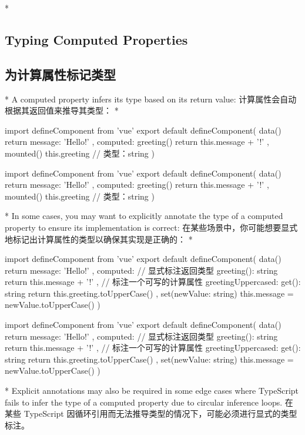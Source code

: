 \begin{paracol}{2} 
 
\switchcolumn[0]*%
\subsection{Typing Computed Properties}
\switchcolumn
\subsection{为计算属性标记类型}
\switchcolumn[0]*%
A computed property infers its type based on its return value:
\switchcolumn
计算属性会自动根据其返回值来推导其类型：
\switchcolumn[0]*%
\begin{codeTs}
import { defineComponent } from 'vue'
export default defineComponent({
  data() {
    return {
      message: 'Hello!'
    }
  },
  computed: {
    greeting() {
      return this.message + '!'
    }
  },
  mounted() {
    this.greeting // 类型：string
  }
})
\end{codeTs}
\switchcolumn
\begin{codeTs}
import { defineComponent } from 'vue'
export default defineComponent({
  data() {
    return {
      message: 'Hello!'
    }
  },
  computed: {
    greeting() {
      return this.message + '!'
    }
  },
  mounted() {
    this.greeting // 类型：string
  }
})
\end{codeTs}
\switchcolumn[0]*%
In some cases, you may want to explicitly annotate the type of a
computed property to ensure its implementation is correct:
\switchcolumn
在某些场景中，你可能想要显式地标记出计算属性的类型以确保其实现是正确的：
\switchcolumn[0]*%
\begin{codeTs}
import { defineComponent } from 'vue'
export default defineComponent({
  data() {
    return {
      message: 'Hello!'
    }
  },
  computed: {
    // 显式标注返回类型
    greeting(): string {
      return this.message + '!'
    },
    // 标注一个可写的计算属性
    greetingUppercased: {
      get(): string {
        return this.greeting.toUpperCase()
      },
      set(newValue: string) {
        this.message = newValue.toUpperCase()
      }
    }
  }
})
\end{codeTs}
\switchcolumn
\begin{codeTs}
import { defineComponent } from 'vue'
export default defineComponent({
  data() {
    return {
      message: 'Hello!'
    }
  },
  computed: {
    // 显式标注返回类型
    greeting(): string {
      return this.message + '!'
    },
    // 标注一个可写的计算属性
    greetingUppercased: {
      get(): string {
        return this.greeting.toUpperCase()
      },
      set(newValue: string) {
        this.message = newValue.toUpperCase()
      }
    }
  }
})
\end{codeTs}
\switchcolumn[0]*%
Explicit annotations may also be required in some edge cases where
TypeScript fails to infer the type of a computed property due to
circular inference loops.
\switchcolumn
在某些 TypeScript
因循环引用而无法推导类型的情况下，可能必须进行显式的类型标注。
\end{paracol}

